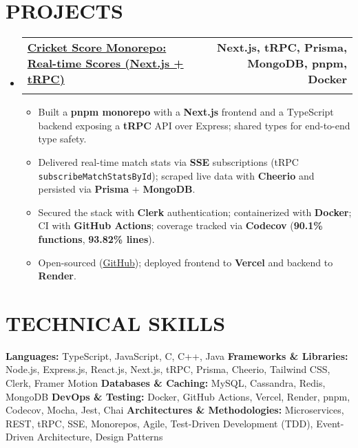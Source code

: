 \documentclass[letterpaper,11pt]{article}
\makeatletter
\newcommand{\resumeSubheading}[4]{
  \vspace{-2pt}\item
    \begin{tabular*}{1.0\textwidth}[t]{l@{\extracolsep{\fill}}r}
      \textbf{\large#1} & \textbf{\small #2} \\
      \textit{\large#3} & \textit{\small #4} \\
    \end{tabular*}\vspace{-7pt}
}
\newcommand{\resumeItem}[1]{
  \item\small{
    {#1 \vspace{-2pt}}
  }
}
\newcommand{\resumeSubHeadingListStart}{\begin{itemize}[leftmargin=0.0in, label={}]}
\newcommand{\resumeSubHeadingListEnd}{\end{itemize}}
\newcommand{\resumeItemListStart}{\begin{itemize}}
\newcommand{\resumeItemListEnd}{\end{itemize}\vspace{-5pt}}
\makeatother
\begin{document}
\section{PROJECTS}
  \resumeSubHeadingListStart
    \resumeSubheading
      {\href{https://cricscore.deveshsangwan.com/}{Cricket Score Monorepo: Real-time Scores (Next.js + tRPC) \raisebox{-0.1\height}{\faLink}}}{Next.js, tRPC, Prisma, MongoDB, pnpm, Docker}{}{}
      \vspace{-10pt}
    \resumeItemListStart
        \resumeItem{Built a \textbf{pnpm monorepo} with a \textbf{Next.js} frontend and a TypeScript backend exposing a \textbf{tRPC} API over Express; shared types for end-to-end type safety.}
        \resumeItem{Delivered real-time match stats via \textbf{SSE} subscriptions (tRPC \texttt{subscribeMatchStatsById}); scraped live data with \textbf{Cheerio} and persisted via \textbf{Prisma} + \textbf{MongoDB}.}
        \resumeItem{Secured the stack with \textbf{Clerk} authentication; containerized with \textbf{Docker}; CI with \textbf{GitHub Actions}; coverage tracked via \textbf{Codecov} (\textbf{90.1\% functions}, \textbf{93.82\% lines}).}
        \resumeItem{Open-sourced (\href{https://github.com/deveshsangwan/cricketScoreApi}{GitHub}); deployed frontend to \textbf{Vercel} and backend to \textbf{Render}.}
    \resumeItemListEnd
  \resumeSubHeadingListEnd

\section{TECHNICAL SKILLS}
    \small{
    \textbf{Languages:} TypeScript, JavaScript, C, C++, Java \newline
    \textbf{Frameworks \& Libraries:} Node.js, Express.js, React.js, Next.js, tRPC, Prisma, Cheerio, Tailwind CSS, Clerk, Framer Motion \newline
    \textbf{Databases \& Caching:} MySQL, Cassandra, Redis, MongoDB \newline
    \textbf{DevOps \& Testing:} Docker, GitHub Actions, Vercel, Render, pnpm, Codecov, Mocha, Jest, Chai \newline
    \textbf{Architectures \& Methodologies:} Microservices, REST, tRPC, SSE, Monorepos, Agile, Test-Driven Development (TDD), Event-Driven Architecture, Design Patterns
    }

\end{document}
